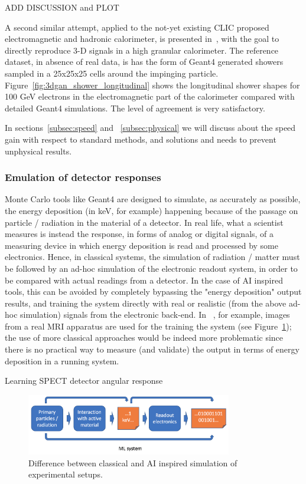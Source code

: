 ADD DISCUSSION and PLOT


A second similar attempt, applied to the not-yet existing CLIC proposed electromagnetic and hadronic calorimeter, is presented in~\cite{3dgan}, with the goal to directly reproduce 3-D signals in a high granular calorimeter. The reference dataset, in absence of real data, is has the form of Geant4 generated showers sampled in a 25x25x25 cells around the impinging particle.
Figure~\ref{fig:3dgan_shower_longitudinal} shows the longitudinal shower shapes for 100 GeV electrons in the electromagnetic part of the calorimeter compared with detailed Geant4 simulations. The level of agreement is very satisfactory.

In sections~\ref{subsec:speed} and ~\ref{subsec:physical} we will discuss about the speed gain with respect to standard methods, and solutions and needs to prevent unphysical results.

\subsubsection{Emulation of detector responses}
Monte Carlo tools like Geant4 are designed to simulate, as accurately as possible, the energy deposition (in keV, for example) happening because of the passage on particle / radiation in the material of a detector. In real life, what a scientist measures is instead the response, in forms of analog or digital signals, of a measuring device in which energy deposition is read and processed by some electronics. Hence, in classical systems, the simulation of radiation / matter must be followed by an ad-hoc simulation of the electronic readout system, in order to be compared with actual readings from a detector. In the case of AI inspired tools, this can be avoided by completely bypassing the "energy deposition" output results, and training the system directly with real or realistic (from the above ad-hoc simulation) signals from the electronic back-end. In ~\cite{mri}, for example, images from a real MRI apparatus are used for the training the system (see Figure~\ref{fig:elec}); the use of more classical approaches would be indeed more problematic since there is no practical way to measure (and validate) the output in terms of energy deposition in a running system.

Learning SPECT detector angular response~\cite{Sarrut2018}

\begin{figure}[h]
    \centering

    \includegraphics[width=0.8\textwidth]{images/electronics.png}
    \caption{Difference between classical and AI inspired simulation of experimental setups.}
     \label{fig:elec}

\end{figure}

